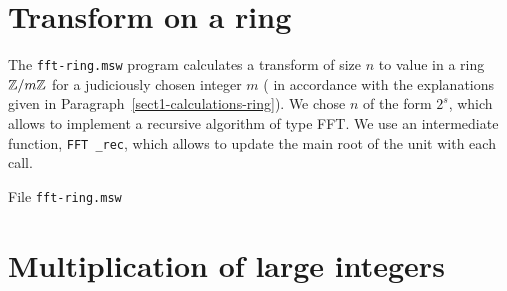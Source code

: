 \section{Transform on a ring}
\label{sect1-listing-transform-ring}
 
 
 The \Maple{} \texttt{fft-ring.msw} program calculates a transform of size $ n $ to value in a ring $ \mathbb{Z}/m \mathbb{Z} $ for a judiciously chosen integer $ m $ ( in accordance with the explanations given in Paragraph~\ref{sect1-calculations-ring}). We chose $ n $ of the form $ 2^s $, which allows to implement a recursive algorithm of type FFT. We use an intermediate function, \texttt{FFT \_rec}, which allows to update the main root of the unit with each call.
 
 
 
\begin{listing} \begin{footnotesize}

\end{footnotesize}
 
\caption{File \texttt{fft-ring.msw}}
 
\label{listing-fft-ring}
\end{listing}
 
\section{Multiplication of large integers}
\label{sect1-listing-mult-large-integers-ring}
 
